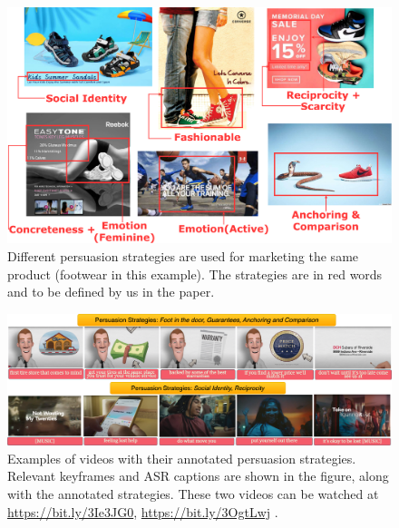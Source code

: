 \documentclass[hidelinks,11pt,a4paper]{report}
\begin{document}
\begin{figure}[t]
    \centering
    \includegraphics[scale=0.08]{images/footwear-strategies.pdf}
    \caption{Different persuasion strategies are used for marketing the same product (footwear in this example). The strategies are in red words and to be defined by us in the paper.}
    \label{fig:footwear-strategies}
\end{figure}


\begin{figure}[!ht]
    \centering
    \includegraphics[width=\textwidth]{images/persuasion-strategies-videos.png}
    \caption{Examples of videos with their annotated persuasion strategies. Relevant keyframes and ASR captions are shown in the figure, along with the annotated strategies. These two videos can be watched at 
    \url{https://bit.ly/3Ie3JG0}, \url{https://bit.ly/3OgtLwj}
    .}
    \label{fig:persuasion-strategy-dataset-examples}
\end{figure}
\end{document}
